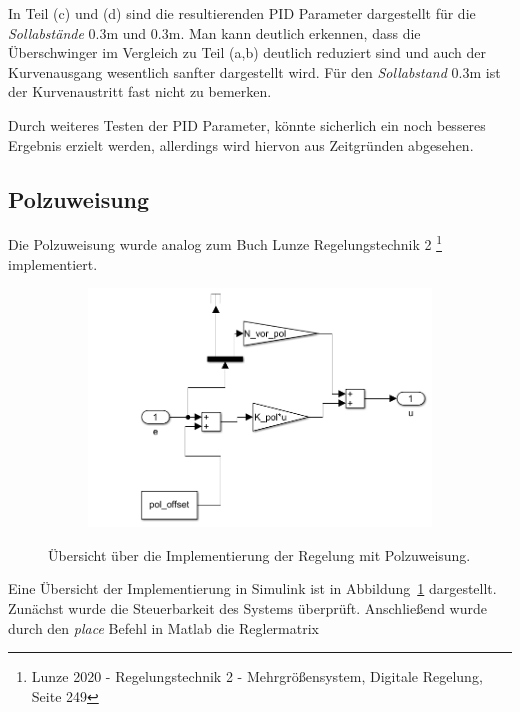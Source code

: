 In Teil (c) und (d) sind die resultierenden PID Parameter dargestellt für die
\textit{Sollabstände} $0.3\mathrm{m}$ und $0.3\mathrm{m}$. Man kann deutlich
erkennen, dass die Überschwinger im Vergleich zu Teil (a,b) deutlich reduziert
sind und auch der Kurvenausgang wesentlich sanfter dargestellt wird. Für den
\textit{Sollabstand} $0.3 \mathrm{m}$ ist der Kurvenaustritt fast nicht zu
bemerken.

Durch weiteres Testen der PID Parameter, könnte sicherlich ein noch besseres
Ergebnis erzielt werden, allerdings wird hiervon aus Zeitgründen abgesehen.

\subsection{Polzuweisung}\label{subsec:polzuweisung}
Die Polzuweisung wurde analog zum Buch Lunze Regelungstechnik 2 \footnote{Lunze
2020 - Regelungstechnik 2 - Mehrgrößensystem, Digitale Regelung, Seite 249}
implementiert. 
\begin{figure}[hbt]
\centering
\begin{subfigure}{0.49\textwidth}
    \centering
    \includegraphics*[width=\textwidth]{figures/polzuw_ueb.png}
\end{subfigure}
    \caption{Übersicht über die Implementierung der Regelung mit Polzuweisung.
    \label{fig:polzuw}}
\end{figure}   
Eine Übersicht der Implementierung in Simulink ist in Abbildung~\ref{fig:polzuw}
dargestellt. Zunächst wurde die Steuerbarkeit des Systems überprüft.
Anschließend wurde durch den \textit{place} Befehl in Matlab die Reglermatrix
